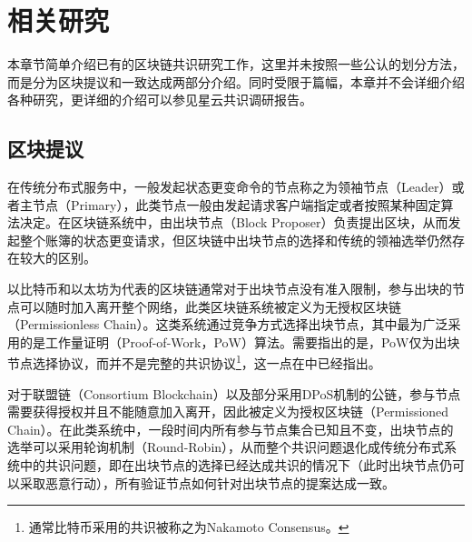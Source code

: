 \section{相关研究}
本章节简单介绍已有的区块链共识研究工作，这里并未按照一些公认的划分方法\cite{wang2019survey,bano2017consensus}，而是分为区块提议和一致达成两部分介绍。同时受限于篇幅，本章并不会详细介绍各种研究，更详细的介绍可以参见星云共识调研报告\cite{nebulassurvey2019}。

\subsection{区块提议}
在传统分布式服务中，一般发起状态更变命令的节点称之为领袖节点（Leader）或者主节点（Primary），此类节点一般由发起请求客户端指定或者按照某种固定算法决定\cite{castro1999practical}。在区块链系统中，由出块节点（Block Proposer）负责提出区块，从而发起整个账簿的状态更变请求，但区块链中出块节点的选择和传统的领袖选举仍然存在较大的区别。%







以比特币\cite{nakamoto2008bitcoin}和以太坊\cite{wood2014ethereum}为代表的区块链通常对于出块节点没有准入限制，参与出块的节点可以随时加入离开整个网络，此类区块链系统被定义为无授权区块链（Permissionless Chain）\cite{pass2017rethinking}。这类系统通过竞争方式选择出块节点，其中最为广泛采用的是工作量证明（Proof-of-Work，PoW）算法\cite{dwork1992pricing}。需要指出的是，PoW仅为出块节点选择协议，而并不是完整的共识协议\footnote{通常比特币采用的共识被称之为Nakamoto Consensus。}，这一点在\cite{nakamoto2008bitcoin}中已经指出。

对于联盟链（Consortium Blockchain）以及部分采用DPoS机制的公链\cite{grigg2017eos}，参与节点需要获得授权并且不能随意加入离开，因此被定义为授权区块链（Permissioned Chain）\cite{pass2017rethinking}。在此类系统中，一段时间内所有参与节点集合已知且不变，出块节点的选举可以采用轮询机制（Round-Robin），从而整个共识问题退化成传统分布式系统中的共识问题，即在出块节点的选择已经达成共识的情况下（此时出块节点仍可以采取恶意行动），所有验证节点如何针对出块节点的提案达成一致\cite{castro1999practical}。

